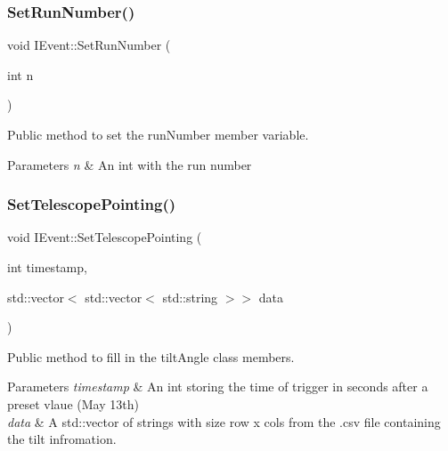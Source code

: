 \subsubsection{\texorpdfstring{Set\+Run\+Number()}{SetRunNumber()}}
{\footnotesize\ttfamily void I\+Event\+::\+Set\+Run\+Number (\begin{DoxyParamCaption}\item[{int}]{n }\end{DoxyParamCaption})}



Public method to set the run\+Number member variable. 


\begin{DoxyParams}{Parameters}
{\em n} & An int with the run number \\
\hline
\end{DoxyParams}
\mbox{\label{classIEvent_aa8d04ba13fcb090b50c25eb07358b9ef}} 
\subsubsection{\texorpdfstring{Set\+Telescope\+Pointing()}{SetTelescopePointing()}}
{\footnotesize\ttfamily void I\+Event\+::\+Set\+Telescope\+Pointing (\begin{DoxyParamCaption}\item[{int}]{timestamp,  }\item[{std\+::vector$<$ std\+::vector$<$ std\+::string $>$$>$}]{data }\end{DoxyParamCaption})}



Public method to fill in the tilt\+Angle class members. 


\begin{DoxyParams}{Parameters}
{\em timestamp} & An int storing the time of trigger in seconds after a preset vlaue (May 13th) \\
\hline
{\em data} & A std\+::vector of strings with size row x cols from the .csv file containing the tilt infromation. \\
\hline
\end{DoxyParams}
\mbox{\label{classIEvent_a8e05e96983ecca92b777dab1bb7b539a}} 
